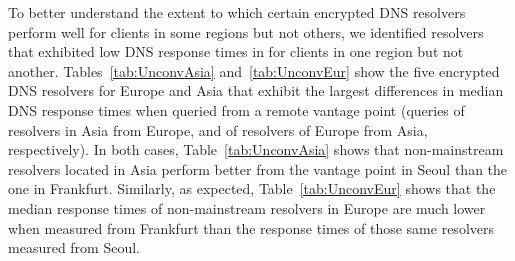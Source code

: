 To better understand the extent to which certain encrypted DNS resolvers
perform well for clients in some regions but not others, we identified
resolvers that exhibited low DNS response times in for clients in one region
but not another. 
Tables~\ref{tab:UnconvAsia} and~\ref{tab:UnconvEur} show 
the five encrypted DNS resolvers for Europe and Asia that exhibit the 
largest differences in median DNS response times when
queried from a remote vantage point (queries of resolvers in Asia from Europe,
and of resolvers of Europe from Asia, respectively). In both cases, 
Table~\ref{tab:UnconvAsia} shows that non-mainstream resolvers located
in Asia perform better from the vantage point in Seoul than the one in
Frankfurt.  Similarly, as expected, Table~\ref{tab:UnconvEur} shows that the
median response times of non-mainstream resolvers in Europe are much lower when
measured from Frankfurt than the response times of those same resolvers
measured from Seoul.
